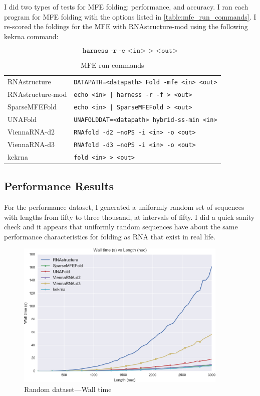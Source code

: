 \documentclass{cshonours}
\begin{document}
I did two types of tests for MFE folding: performance, and accuracy. I ran each program for MFE folding with the options listed in \autoref{table:mfe_run_commands}. I re-scored the foldings for the MFE with RNAstructure-mod using the following kekrna command:

$$\texttt{harness -r -e <in> > <out>}$$

\begin{table}
\begin{adjustbox}{center}
\begin{tabular}{ll}
RNAstructure &\texttt{DATAPATH=<datapath> Fold -mfe <in> <out>} \\
RNAstructure-mod & \texttt{echo <in> | harness -r -f > <out>} \\
SparseMFEFold & \texttt{echo <in> | SparseMFEFold > <out>} \\
UNAFold &\texttt{UNAFOLDDAT=<datapath> hybrid-ss-min <in>} \\
ViennaRNA-d2 &\texttt{RNAfold -d2 --noPS -i <in> -o <out>} \\
ViennaRNA-d3 &\texttt{RNAfold -d3 --noPS -i <in> -o <out>} \\
kekrna & \texttt{fold <in> > <out>} \\
\end{tabular}
\end{adjustbox}
\caption{MFE run commands}
\label{table:mfe_run_commands}
\end{table}

\subsection{Performance Results}

For the performance dataset, I generated a uniformly random set of sequences with lengths from fifty to three thousand, at intervals of fifty. I did a quick sanity check and it appears that uniformly random sequences have about the same performance characteristics for folding as RNA that exist in real life.

\begin{figure}[p]
\centering
\includegraphics[width=0.9\textwidth]{res/random_real.png}
\caption{Random dataset---Wall time}
\label{fig:random_real}
\end{figure}
\end{document}
